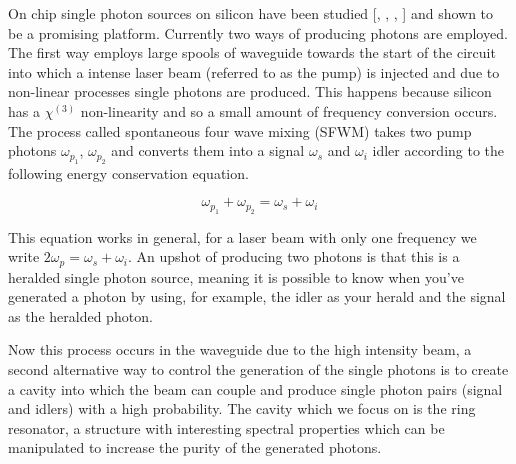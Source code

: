 On chip single photon sources on silicon have been studied [, , , ] and shown to be a promising platform. Currently two ways of producing photons are employed. The first way employs large spools of waveguide towards the start of the circuit into which a intense laser beam (referred to as the pump) is injected and due to non-linear processes single photons are produced. This happens because silicon has a $\chi^{(3)}$ non-linearity and so a small amount of frequency conversion occurs. The process called spontaneous four wave mixing (SFWM) takes two pump photons $\omega_{p_1}$, $\omega_{p_2}$ and converts them into a signal $\omega_s$ and  $\omega_i$ idler according to the following energy conservation equation.

\begin{equation} \label{energyConservation}
\omega_{p_1}+\omega_{p_2}=\omega_s+\omega_i
\end{equation}

This equation works in general, for a laser beam with only one frequency we write $2\omega_p=\omega_s+\omega_i$. An upshot of producing two photons is that this is a heralded single photon source, meaning it is possible to know when you've generated a photon by using, for example, the idler as your herald and the signal as the heralded photon. 

Now this process occurs in the waveguide due to the high intensity beam, a second alternative way to control the generation of the single photons is to create a cavity into which the beam can couple and produce single photon pairs (signal and idlers) with a high probability. The cavity which we focus on is the ring resonator, a structure with interesting spectral properties which can be manipulated to increase the purity of the generated photons. 



